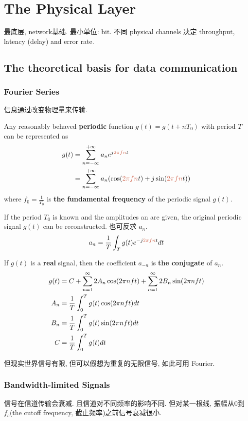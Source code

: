 \newpage
\section{The Physical Layer}
最底层, network基础. 最小单位: bit. 不同 physical channels 决定 throughput, latency (delay) and error rate. 

\subsection{The theoretical basis for data communication}
\subsubsection{Fourier Series}
信息通过改变物理量来传输. 

Any reasonably behaved \textbf{periodic} function $g(t)=g(t+nT_0)$ with period $T$ can be represented as
\begin{align*}
    g(t)&=\sum_{n=-\infty}^{+\infty}a_n e^{j\textcolor{light_red}{2\pi fn}t}\\
    &=\sum_{n=-\infty}^{+\infty} a_n (\cos(\textcolor{light_red}{2\pi fn}t)+j\sin(\textcolor{light_red}{2\pi fn}t))
\end{align*}
where $f_0=\frac{1}{T_0}$ is \textbf{the fundamental frequency} of the periodic signal $g(t)$. 

If the period $T_0$ is known and the amplitudes an are given, the original periodic signal $g(t)$ can be reconstructed. 也可反求 $a_n$. 
\begin{align*}
    a_n=\frac{1}{T}\int_T g(t)e^{-j\textcolor{light_red}{2\pi fn}t}dt
\end{align*}


If $g(t)$ is a \textbf{real} signal, then the coefficient $a_{-n}$ is \textbf{the conjugate} of $a_n$.
\begin{align}
    g(t)&=C+\sum_{n=1}^{\infty}2A_n\cos (2\pi nft)+\sum_{n=1}^\infty 2B_n\sin (2\pi n ft)\\
    \notag A_n&=\frac{1}{T}\int_0^T g(t)\cos(2\pi nft)dt\\
    \notag B_n&=\frac{1}{T}\int_0^T g(t)\sin(2\pi nft)dt\\
    \notag C  &=\frac{1}{T}\int_0^T g(t)dt
\end{align}

但现实世界信号有限, 但可以假想为重复的无限信号, 如此可用 Fourier. 

\subsubsection{Bandwidth-limited Signals}
信号在信道传输会衰减. 且信道对不同频率的影响不同. 但对某一根线, 振幅从0到$f_c$(the cutoff frequency, 截止频率)之前信号衰减很小. 

